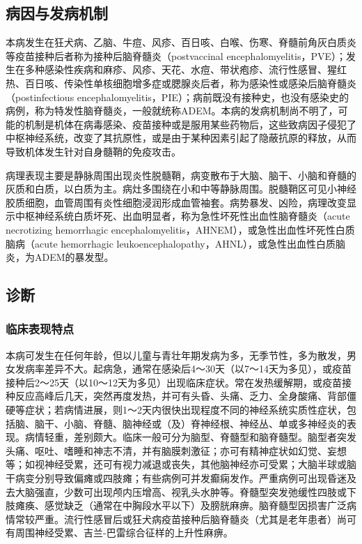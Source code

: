 \subsection{病因与发病机制}

本病发生在狂犬病、乙脑、牛痘、风疹、百日咳、白喉、伤寒、脊髓前角灰白质炎等疫苗接种后者称为接种后脑脊髓炎（postvaccinal
encephalomyelitis，PVE）；发生在多种感染性疾病和麻疹、风疹、天花、水痘、带状疱疹、流行性感冒、猩红热、百日咳、传染性单核细胞增多症或腮腺炎后者，称为感染性或感染后脑脊髓炎（postinfectious
encephalomyelitis，PIE）；病前既没有接种史，也没有感染史的病例，称为特发性脑脊髓炎，一般就统称ADEM。本病的发病机制尚不明了，可能的机制是机体在病毒感染、疫苗接种或是服用某些药物后，这些致病因子侵犯了中枢神经系统，改变了其抗原性，或是由于某种因素引起了隐蔽抗原的释放，从而导致机体发生针对自身髓鞘的免疫攻击。

病理表现主要是静脉周围出现炎性脱髓鞘，病变散布于大脑、脑干、小脑和脊髓的灰质和白质，以白质为主。病灶多围绕在小和中等静脉周围。脱髓鞘区可见小神经胶质细胞，血管周围有炎性细胞浸润形成血管袖套。病势暴发、凶险，病理改变显示中枢神经系统白质坏死、出血明显者，称为急性坏死性出血性脑脊髓炎（acute
necrotizing hemorrhagic
encephalomyelitis，AHNEM），或急性出血性坏死性白质脑病（acute
hemorrhagic
leukoencephalopathy，AHNL），或急性出血性白质脑炎，为ADEM的暴发型。

\subsection{诊断}

\subsubsection{临床表现特点}

本病可发生在任何年龄，但以儿童与青壮年期发病为多，无季节性，多为散发，男女发病率差异不大。起病急，通常在感染后4～30天（以7～14天为多见），或疫苗接种后2～25天（以10～12天为多见）出现临床症状。常在发热缓解期，或疫苗接种反应高峰后几天，突然再度发热，并可有头昏、头痛、乏力、全身酸痛、背部僵硬等症状；若病情进展，则1～2天内很快出现程度不同的神经系统实质性症状，包括脑、脑干、小脑、脊髓、脑神经或（及）脊神经根、神经丛、单或多神经炎的表现。病情轻重，差别颇大。临床一般可分为脑型、脊髓型和脑脊髓型。脑型者突发头痛、呕吐、嗜睡和神志不清，并有脑膜刺激征；亦可有精神症状如幻觉、妄想等；如视神经受累，还可有视力减退或丧失，其他脑神经亦可受累；大脑半球或脑干病变分别导致偏瘫或四肢瘫；有些病例可并发癫痫发作。严重病例可出现昏迷及去大脑强直，少数可出现颅内压增高、视乳头水肿等。脊髓型突发弛缓性四肢或下肢瘫痪、感觉缺乏（通常在中胸段水平以下）及膀胱麻痹。脑脊髓型因损害广泛病情常较严重。流行性感冒后或狂犬病疫苗接种后脑脊髓炎（尤其是老年患者）尚可有周围神经受累、吉兰-巴雷综合征样的上升性麻痹。

